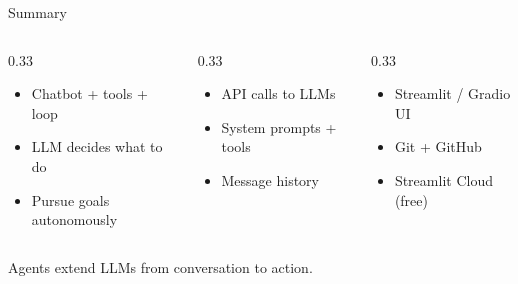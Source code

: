 \documentclass[aspectratio=169]{beamer}
\begin{document}
\begin{frame}{Summary}
\begin{columns}[T]
\begin{column}{0.33\textwidth}
\begin{shadedbox}[title=\textbf{Agents}]
\begin{itemize}\small
  \item Chatbot + tools + loop
  \item LLM decides what to do
  \item Pursue goals autonomously
\end{itemize}
\end{shadedbox}
\end{column}
\begin{column}{0.33\textwidth}
\begin{shadedbox}[title=\textbf{Building Blocks}]
\begin{itemize}\small
  \item API calls to LLMs
  \item System prompts + tools
  \item Message history
\end{itemize}
\end{shadedbox}
\end{column}
\begin{column}{0.33\textwidth}
\begin{shadedbox}[title=\textbf{Deployment}]
\begin{itemize}\small
  \item Streamlit / Gradio UI
  \item Git + GitHub
  \item Streamlit Cloud (free)
\end{itemize}
\end{shadedbox}
\end{column}
\end{columns}
\vspace{0.5cm}
\begin{center}
\alert{Agents extend LLMs from conversation to action.}
\end{center}
\end{frame}
\end{document}
